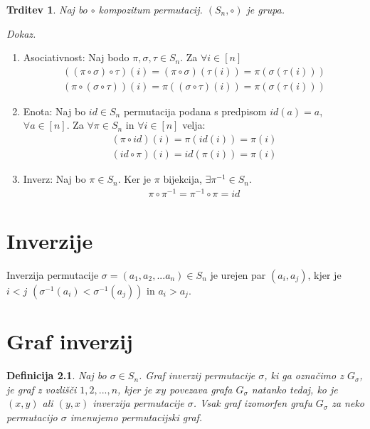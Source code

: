 \documentclass[a4paper, 12pt]{book}
\newtheorem{definicija}{Definicija}[chapter]
\newtheorem{trditev}{Trditev}[izrek]
\newenvironment{dokaz}{\emph{Dokaz.}\ }{\hspace{\fill}{$\Box$}}
\begin{document}
\begin{trditev}
    Naj bo $\circ$ kompozitum permutacij. $(S_n, \circ)$ je grupa.
\end{trditev}
\begin{dokaz}
    \begin{enumerate}
        \item Asociativnost: Naj bodo $\pi, \sigma, \tau \in S_n$. Za $\forall i \in [n]$ 
        \begin{align}
            ((\pi \circ \sigma) \circ \tau)(i) = (\pi \circ \sigma)(\tau(i)) = \pi(\sigma(\tau(i)))\\
            (\pi \circ (\sigma \circ \tau))(i) = \pi((\sigma \circ \tau)(i)) = \pi(\sigma(\tau(i))) 
        \end{align}
        \item Enota: Naj bo $id \in S_n$ permutacija podana s predpisom $id(a) = a$, $\forall a \in [n]$. Za $\forall \pi \in S_n$ in $\forall i \in [n]$ velja:
        \begin{align}
            (\pi \circ id)(i) = \pi(id(i)) = \pi(i) \\
            (id \circ \pi)(i) = id(\pi(i)) = \pi(i)
        \end{align}
        \item Inverz: Naj bo $\pi \in S_n$. Ker je $\pi$ bijekcija, $\exists \pi^{-1} \in S_n$.
        \begin{align}
            \pi \circ \pi^{-1} = \pi^{-1} \circ \pi = id
        \end{align}
    \end{enumerate}
\end{dokaz}

\chapter{ Inverzije }

Inverzija permutacije $\sigma = (a_1, a_2,... a_n) \in S_n$ je urejen par $(a_i, a_j)$, kjer je $i < j$ $(\sigma^{-1}(a_i) < \sigma^{-1}(a_j))$ in $a_i > a_j$.

\chapter{ Graf inverzij }

\begin{definicija}
    Naj bo $\sigma \in S_n$. Graf inverzij permutacije $\sigma$, ki ga označimo z $G_{\sigma}$,  je graf z vozlišči $1, 2,..., n$, kjer je $xy$ povezava grafa $G_{\sigma}$ natanko tedaj, ko je $(x, y)$ ali $(y, x)$ inverzija permutacije $\sigma$. Vsak graf izomorfen grafu $G_{\sigma}$ za neko permutacijo $\sigma$ imenujemo permutacijski graf.
\end{definicija}
\end{document}

